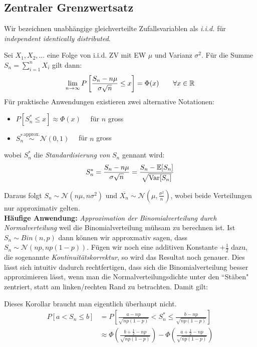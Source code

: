 \subsection{Zentraler Grenzwertsatz}
Wir bezeichnen unabhängige gleichverteilte Zufallsvariablen als \textit{i.i.d.} für \textit{independent identically distributed}.
\begin{satz}
Sei $X_1,X_2,\dots$ eine Folge von i.i.d. ZV mit EW $\mu$ und Varianz $\sigma^2$. Für die Summe $S_n = \sum_{i=1}^n X_i$ gilt dann:
$$ \lim_{n\to\infty} P\left[\frac{S_n - n\mu}{\sigma \sqrt{n}} \leq x \right] = \Phi(x) \quad \quad \forall x\in\mathbb{R}$$
Für praktische Anwendungen existieren zwei alternative Notationen:
\begin{itemize}
\item $P[S_n^* \leq x ] \approx \Phi(x) \quad$ für $n$ gross
\item $S_n^* \overset{\mbox{approx.}}{\sim} \mathcal{N}(0,1) \quad$ für $n$ gross
\end{itemize}
wobei $S_n^*$ die \textit{Standardisierung von} $S_n$ gennant wird:
$$ S_n^* = \frac{S_n - n\mu}{\sigma\sqrt{n}}= \frac{S_n - \mathbb{E}[S_n]}{\sqrt{\mathrm{Var}[S_n]}}$$
\end{satz}
Daraus folgt $S_n \sim \mathcal{N}(n\mu,n\sigma^2)$ und $\overline{X_n} \sim \mathcal{N}(\mu, \frac{\sigma^2}{n} )$, wobei beide Verteilungen nur approximativ gelten.\\

\textbf{Häufige Anwendung:} \textit{Approximation der Binomialverteilung durch Normalverteilung} weil die Binomialverteilung mühsam zu berechnen ist. Ist $S_n \sim Bin(n,p)$ dann können wir approxmativ sagen, dass $S_n \sim \mathcal{N}(np, np(1-p))$. Fügen wir noch eine additiven Konstante $+\frac{1}{2}$ dazu, die sogenannte \textit{Kontinuitätskorrektur}, so wird das Resultat noch genauer. Dies lässt sich intuitiv dadurch rechtfertigen, dass sich die Binomialverteilung besser approximieren lässt, wenn man die Normalverteilungsdichte unter den ``Stäben" zentriert, statt am linken/rechten Rand zu betrachten. Damit gilt:\\
\begin{korollar}
Dieses Korollar braucht man eigentlich überhaupt nicht.
\begin{align*}
	P[a <  S_n \leq b] &= P \left[ \frac{a-np}{\sqrt{np(1-p)}} < S_n^* \leq \frac{b-np}{\sqrt{np(1-p)}} \right]\\&\approx \Phi \left(\frac{b+\frac{1}{2}-np}{\sqrt{np(1-p)}}\right) - \Phi \left( \frac{a+\frac{1}{2}-np}{\sqrt{np(1-p)}} \right)
\end{align*}
\end{korollar}

